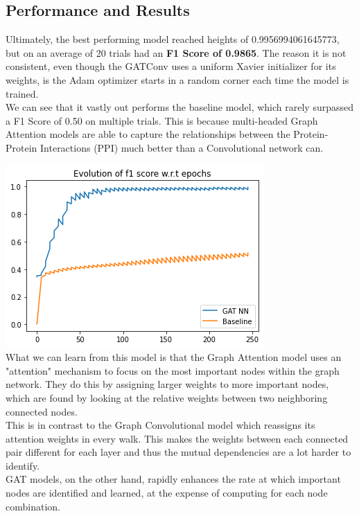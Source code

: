\documentclass[13pt,english]{article}
\begin{document}
\subsection{Performance and Results}
Ultimately, the best performing model reached heights of 0.9956994061645773, but on an average of 20 trials had an \textbf{F1 Score of 0.9865}. The reason it is not consistent, even though the GATConv uses a uniform Xavier initializer for its weights, is the Adam optimizer starts in a random corner each time the model is trained. \\
We can see that it vastly out performs the baseline model, which rarely surpassed a F1 Score of 0.50 on multiple trials. This is because multi-headed Graph Attention models are able to capture the relationships between the Protein-Protein Interactions (PPI) much better than a Convolutional network can. 

\includegraphics[width=\textwidth]{F1Scores.png} \\


What we can learn from this model is that the Graph Attention model uses an "attention" mechanism to focus on the most important nodes within the graph network. They do this by assigning larger weights to more important nodes, which are found by looking at the relative weights between two neighboring connected nodes. \\
This is in contrast to the Graph Convolutional model which reassigns its attention weights in every walk. This makes the weights between each connected pair different for each layer and thus the mutual dependencies are a lot harder to identify. \\
GAT models, on the other hand, rapidly enhances the rate at which important nodes are identified and learned, at the expense of computing for each node combination.  
\end{document}
